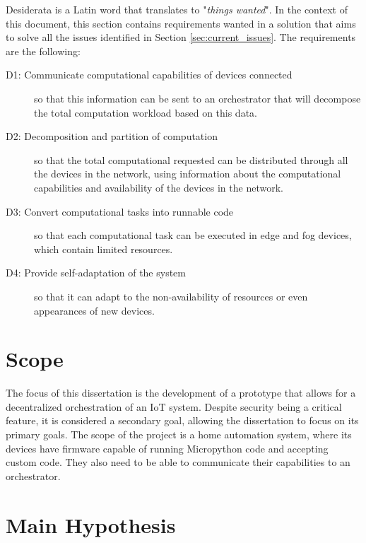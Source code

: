 Desiderata is a Latin word that translates to "\emph{things wanted}". In the context of this document, this section contains requirements wanted in a solution that aims to solve all the issues identified in Section \ref{sec:current_issues}. The requirements are the following:

\begin{description}
    \item [D1: Communicate computational capabilities of devices connected] so that this information can be sent to an orchestrator that will decompose the total computation workload based on this data.
    \item [D2: Decomposition and partition of computation] so that the total computational requested can be distributed through all the devices in the network, using information about the computational capabilities and availability of the devices in the network.
    \item [D3: Convert computational tasks into runnable code] so that each computational task can be executed in edge and fog devices, which contain limited resources.
    \item [D4: Provide self-adaptation of the system] so that it can adapt to the non-availability of resources or even appearances of new devices.
\end{description}

\section{Scope}\label{sec:scope}

The focus of this dissertation is the development of a prototype that allows for a decentralized orchestration of an IoT system. Despite security being a critical feature, it is considered a secondary goal, allowing the dissertation to focus on its primary goals. The scope of the project is a home automation system, where its devices have firmware capable of running  Micropython code and accepting custom code. They also need to be able to communicate their capabilities to an orchestrator.


\section{Main Hypothesis}\label{sec:main_hypothesis}

